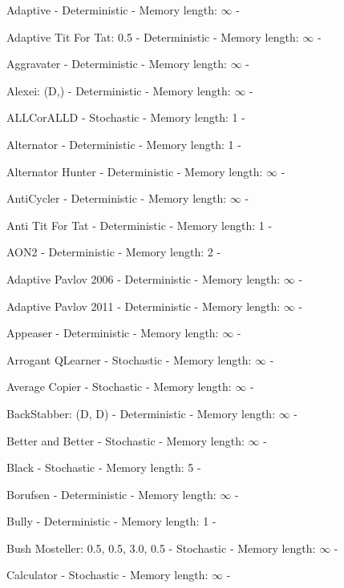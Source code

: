 \item Adaptive - Deterministic - Memory length: \(\infty\) - \cite{Li2011}
\item Adaptive Tit For Tat: 0.5 - Deterministic - Memory length: \(\infty\) - \cite{Tzafestas2000}
\item Aggravater - Deterministic - Memory length: \(\infty\) - \cite{Knight2018}
\item Alexei: (D,) - Deterministic - Memory length: \(\infty\) - \cite{LessWrong2011}
\item ALLCorALLD - Stochastic - Memory length: 1 - \cite{Akin2015}
\item Alternator - Deterministic - Memory length: 1 - \cite{Axelrod1984, Mittal2009}
\item Alternator Hunter - Deterministic - Memory length: \(\infty\) - \cite{Knight2018}
\item AntiCycler - Deterministic - Memory length: \(\infty\) - \cite{Knight2018}
\item Anti Tit For Tat - Deterministic - Memory length: 1 - \cite{Hilbe2013}
\item AON2 - Deterministic - Memory length: 2 - \cite{Hilbe2017}
\item Adaptive Pavlov 2006 - Deterministic - Memory length: \(\infty\) - \cite{Li2007}
\item Adaptive Pavlov 2011 - Deterministic - Memory length: \(\infty\) - \cite{Li2011}
\item Appeaser - Deterministic - Memory length: \(\infty\) - \cite{Knight2018}
\item Arrogant QLearner - Stochastic - Memory length: \(\infty\) - \cite{Knight2018}
\item Average Copier - Stochastic - Memory length: \(\infty\) - \cite{Knight2018}
\item BackStabber: (D, D) - Deterministic - Memory length: \(\infty\) - \cite{Knight2018}
\item Better and Better - Stochastic - Memory length: \(\infty\) - \cite{Prison1998}
\item Black - Stochastic - Memory length: 5 - \cite{Axelrod1980b}
\item Borufsen - Deterministic - Memory length: \(\infty\) - \cite{Axelrod1980b}
\item Bully - Deterministic - Memory length: 1 - \cite{Nachbar1992}
\item Bush Mosteller: 0.5, 0.5, 3.0, 0.5 - Stochastic - Memory length: \(\infty\) - \cite{Luis2008}
\item Calculator - Stochastic - Memory length: \(\infty\) - \cite{Prison1998}
